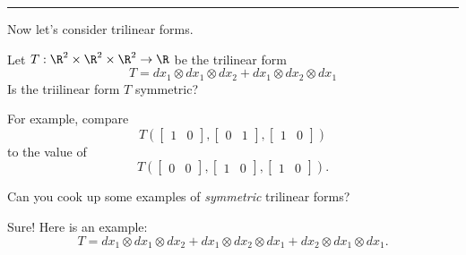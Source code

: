 \documentclass{ximera}
\begin{document}
\begin{question}
  \hrule

  Now let's consider trilinear forms.

  Let $T : \R^2 \times \R^2 \times \R^2 \to \R$ be the trilinear form
  $$
  T = dx_1 \otimes dx_1 \otimes dx_2 + dx_1 \otimes dx_2 \otimes dx_1
  $$
  Is the triilinear form $T$ symmetric?
  \begin{solution}
    \begin{multiple-choice}
    \end{multiple-choice}
  \end{solution}  

  For example, compare
  $$
  T\left( \begin{bmatrix} 1 & 0 \end{bmatrix}, \begin{bmatrix} 0 & 1 \end{bmatrix}, \begin{bmatrix} 1 & 0 \end{bmatrix} \right)
  $$
  to the value of 
  $$
  T\left( \begin{bmatrix} 0 & 0 \end{bmatrix}, \begin{bmatrix} 1 & 0 \end{bmatrix}, \begin{bmatrix} 1 & 0 \end{bmatrix} \right).
  $$

  Can you cook up some examples of \textit{symmetric} trilinear forms?
  \begin{free-response}
    Sure!   Here is an example:
    $$
    T = dx_1 \otimes dx_1 \otimes dx_2 + dx_1 \otimes dx_2 \otimes dx_1 + dx_2 \otimes dx_1 \otimes dx_1.
    $$
  \end{free-response}

\end{question}
\end{document}
